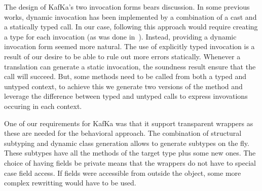 \documentclass[a4paper,UKenglish]{lipics-v2018}
\newcommand{\kafka}{{\sf KafKa}\xspace}
\newcounter{lem}
\begin{document}
The design of \kafka's two invocation forms bears discussion. In some
previous works, dynamic invocation has been implemented by a combination of
a cast and a statically typed call. In our case, following this approach
would require creating a type for each invocation (as was done
in~\cite{popl10}). Instead, providing a dynamic invocation form seemed more
natural. The use of explicitly typed invocation is a result of our desire
to be able to rule out more errors statically. Whenever a translation can
generate a static invocation, the soundness result ensure that the call will
succeed. But, some methods need to be called from both a typed and untyped
context, to achieve this we generate two versions of the method and leverage
the difference between typed and untyped calls to express invovations
occuring in each context.

One of our requirements for \kafka was that it support transparent wrappers
as these are needed for the behavioral approach. The combination of
structural subtyping and dynamic class generation allows to generate
subtypes on the fly. These subtypes have all the methods of the target type
plus some new ones. The choice of having fields be private means that the
wrappers do not have to special case field access. If fields were accessible
from outside the object, some more complex rewritting would have to be
used.
\end{document}
